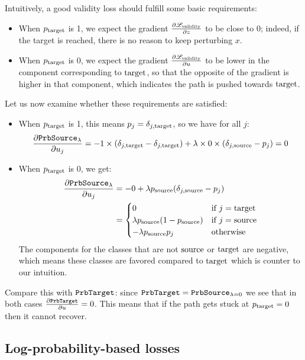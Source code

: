 \documentclass[../main.tex]{subfiles}
\begin{document}
Intuitively, a good validity loss should fulfill some basic requirements:
\begin{itemize}
\item When $p_{\mathrm{target}}$ is 1, we expect the gradient $\frac{\partial \mathscr{L}_\text{validity}}{\partial z}$ to be close to 0; indeed, if the target is reached, there is no reason to keep perturbing $x$.
\item When $p_{\mathrm{target}}$ is 0, we expect the gradient $\frac{\partial \mathscr{L}_\text{validity}}{\partial u}$ to be lower in the component corresponding to $\mathrm{target}$, so that the opposite of the gradient is higher in that component, which indicates the path is pushed towards $\mathrm{target}$.
\end{itemize}

Let us now examine whether these requirements are satisfied:
\begin{itemize}
    \item When $p_{\mathrm{target}}$ is 1, this means $p_j = \delta_{j, \mathrm{target}}$, so we have for all $j$:
          \begin{equation*}
\frac{\partial \mathtt{PrbSource}_{\lambda}}{\partial u_j} = -1 \times (\delta_{j, \mathrm{target}} -\delta_{j, \mathrm{target}}) + \lambda \times 0 \times (\delta_{j, \mathrm{source}} - p_j) = 0
          \end{equation*}
    \item When $p_{\mathrm{target}}$ is 0, we get:
          \begin{align*}
\frac{\partial \mathtt{PrbSource}_{\lambda}}{\partial u_j}
& = -0 + \lambda p_{\mathrm{source}} (\delta_{j, \mathrm{source}} - p_j)                        \\
               & = \begin{cases}
                       0                         & \text{if } j = \mathrm{target} \\
\lambda p_{\mathrm{source}} (1 - p_{\mathrm{source}}) & \text{if } j = \mathrm{source} \\
- \lambda p_{\mathrm{source}} p_j           & \text{otherwise}
                   \end{cases}
          \end{align*}
          The components for the classes that are not $\mathrm{source}$ or $\mathrm{target}$ are negative, which means these classes are favored compared to $\mathrm{target}$ which is counter to our intuition.
\end{itemize}

Compare this with $\mathtt{PrbTarget}$: since $\mathtt{PrbTarget} = \mathtt{PrbSource}_{\lambda=0}$ we see that in both cases $\frac{\partial \mathtt{PrbTarget}}{\partial u} = 0$.
This means that if the path gets stuck at $p_{\mathrm{target}} = 0$ then it cannot recover.

\subsection{Log-probability-based losses}
\end{document}
